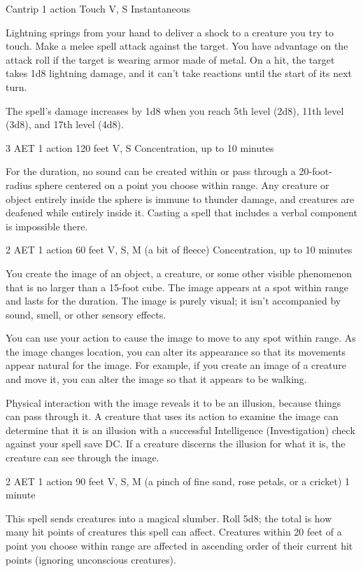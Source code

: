 {Cantrip}
{1 action}
{Touch}
{V, S}
{Instantaneous}

Lightning springs from your hand to deliver a shock to a creature you try to touch. Make a melee spell attack against the target. You have advantage on the attack roll if the target is wearing armor made of metal. On a hit, the target takes 1d8 lightning damage, and it can't take reactions until the start of its next turn.

The spell's damage increases by 1d8 when you reach 5th level (2d8), 11th level (3d8), and 17th level (4d8).

{3 AET}
{1 action}
{120 feet}
{V, S}
{Concentration, up to 10 minutes}

For the duration, no sound can be created within or pass through a 20-foot-radius sphere centered on a point you choose within range. Any creature or object entirely inside the sphere is immune to thunder damage, and creatures are deafened while entirely inside it. Casting a spell that includes a verbal component is impossible there.

{2 AET}
{1 action}
{60 feet}
{V, S, M (a bit of fleece)}
{Concentration, up to 10 minutes}

You create the image of an object, a creature, or some other visible phenomenon that is no larger than a 15-foot cube. The image appears at a spot within range and lasts for the duration. The image is purely visual; it isn't accompanied by sound, smell, or other sensory effects.

You can use your action to cause the image to move to any spot within range. As the image changes location, you can alter its appearance so that its movements appear natural for the image. For example, if you create an image of a creature and move it, you can alter the image so that it appears to be walking.

Physical interaction with the image reveals it to be an illusion, because things can pass through it. A creature that uses its action to examine the image can determine that it is an illusion with a successful Intelligence (Investigation) check against your spell save DC. If a creature discerns the illusion for what it is, the creature can see through the image.

{2 AET}
{1 action}
{90 feet}
{V, S, M (a pinch of fine sand, rose petals, or a cricket)}
{1 minute}

This spell sends creatures into a magical slumber. Roll 5d8; the total is how many hit points of creatures this spell can affect. Creatures within 20 feet of a point you choose within range are affected in ascending order of their current hit points (ignoring unconscious creatures).

